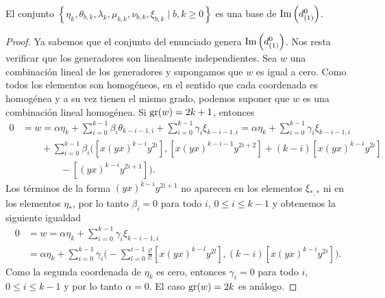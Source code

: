 \documentclass[fleqn,../tesis.tex]{subfiles}
\begin{document}
\begin{prop}\label{coh_ima_d01}
    El conjunto $\left\lbrace \eta_k, \theta_{b , k}, \lambda_k, \mu_{b , k}, \nu_{b, k}, \xi_{b, k} \mid b, k \geq 0 \right\rbrace$
    es una base de $\operatorname{Im}\left(d^{0}_{(1)}\right)$.
\end{prop}
\begin{proof}
    Ya sabemos que el conjunto del enunciado genera $\operatorname{Im}\left(d^{0}_{(1)}\right)$. Nos resta verificar que los generadores son linealmente
    independientes. Sea $w$ una combinación lineal de los generadores y supongamos que $w$ es igual a cero. Como todos los elementos son homogéneos, en el sentido que cada
    coordenada es homogénea y a su vez tienen el mismo grado, podemos suponer que $w$ es una combinación lineal homogénea. Si $\operatorname{gr}(w) = 2k + 1$,
    entonces
    \begin{align*}
        0 &= w = \alpha \eta_k + \sum_{i = 0}^{k - 1} \beta_i \theta_{k -i - 1, i} + \sum_{i = 0}^{k - 1}\gamma_i \xi_{k - i - 1, i}
        = \alpha \eta_k + \sum_{i = 0}^{k - 1}\gamma_i \xi_{k - i - 1, i}\\
        &\qquad + \sum_{i = 0}^{k - 1} \beta_i \Bigg(\left[x(yx)^{k - i}y^{2i}\right],
            \left[x(yx)^{k - i - 1}y^{2i + 2}\right] + (k - i)\left[x(yx)^{k - i}y^{2i}\right]\\
            &\qquad \qquad - \left[(yx)^{k - i}y^{2i + 1}\right]\Bigg).
    \end{align*}
    Los términos de la forma $(yx)^{k - i}y^{2i + 1}$ no aparecen en los elementos $\xi_{\ast, \ast}$ ni en los elementos $\eta_{\ast}$, por lo tanto $\beta_i = 0$ para todo $i$, $0 \leq i \leq k - 1$ y obtenemos la siguiente igualdad
    \begin{align*}
        0 &= w = \alpha \eta_k +  \sum_{i = 0}^{k - 1}\gamma_i \xi_{k - i - 1, i} \\
        &= \alpha \eta_k + \sum_{i = 0}^{k - 1}\gamma_i \Bigg(-\sum_{l = 0}^{i - 1}\frac{i!}{l!}\left[x(yx)^{k - l}y^{2l}\right],
                  (k - i)\left[x(yx)^{k - i}y^{2i}\right]\Bigg).
    \end{align*}
    Como la segunda coordenada de $\eta_k$ es cero, entonces $\gamma_i = 0$ para todo $i$, $0 \leq i \leq k - 1$ y por lo tanto
    $\alpha = 0$. El caso $\operatorname{gr}(w) = 2k$ es análogo.
\end{proof}
\end{document}
